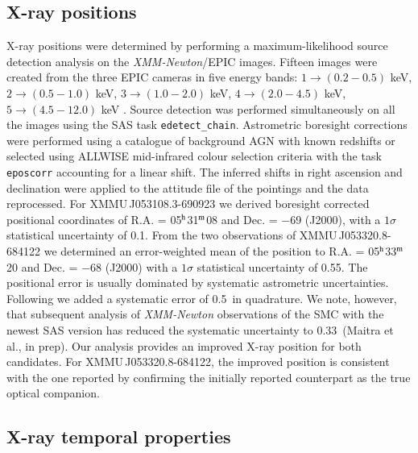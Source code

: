 \documentclass[a4paper,fleqn,usenatbib]{mnras}
\newcommand{\xmm}{{\it XMM-Newton}\xspace}
\newcommand{\canda}{XMMU\,J053108.3-690923\xspace} %
\newcommand{\candb}{XMMU\,J053320.8-684122\xspace} %
\begin{document}
\subsection{X-ray positions}
\label{sec:xray_pos}

X-ray positions were determined by performing a maximum-likelihood source detection analysis on the \xmm/EPIC images.
Fifteen images were created from the three EPIC cameras in five energy bands: $1\rightarrow(0.2-0.5)$ keV, $2\rightarrow(0.5-1.0)$ keV, $3\rightarrow(1.0-2.0)$ keV, $4\rightarrow(2.0-4.5)$ keV, $5\rightarrow(4.5-12.0)$ keV \citep{2009A&A...493..339W,2013A&A...558A...3S}.
Source detection was performed simultaneously on all the images using the SAS task {\tt edetect\_chain}. 
Astrometric boresight corrections were performed using a catalogue of background AGN with known redshifts or selected using ALLWISE mid-infrared colour selection criteria \citep{2012MNRAS.426.3271M,2015ApJS..221...12S} with the task {\tt eposcorr} accounting for a linear shift. The inferred shifts in right ascension and declination were applied to the attitude file of the pointings and the data reprocessed.    
% 
For \canda we derived boresight corrected positional coordinates of 
R.A. = 05$^{\rm h}$31$^{\rm m}$08 and Dec. = $-$69 (J2000),
with a $1\sigma$ statistical uncertainty of 0.1\arcsec.
% 
From the two observations of \candb we determined an error-weighted mean of the position to 
R.A. = 05$^{\rm h}$33$^{\rm m}$20 and Dec. = $-$68 (J2000)
with a $1\sigma$ statistical uncertainty of 0.55\arcsec.
%
The positional error is usually dominated by systematic astrometric uncertainties. Following  \citet{2013A&A...558A...3S} we added
a systematic error of 0.5\arcsec\ in quadrature. 
We note, however, that subsequent analysis of \xmm observations of the SMC with the newest SAS version has reduced the systematic uncertainty to 0.33\arcsec\ (Maitra et al., in prep).
Our analysis provides an improved X-ray position for both candidates.  
For \candb, the improved position is consistent with the one reported by \citet{2012ATel.3993....1S} confirming the initially reported counterpart \citep[i.e. blue supergiant Sk\,-68\,122;][]{1970CoTol..89.....S} as the true optical companion.


\subsection{X-ray temporal properties}
\label{sec-time_an}
\end{document}
